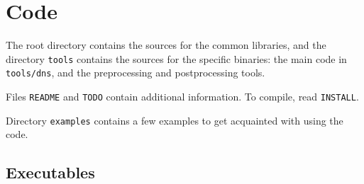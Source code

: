 \chapter{Code}\label{sec:code}

The root directory contains the sources for the common libraries, and the directory {\tt tools} contains the sources for the specific binaries: the main code in {\tt tools/dns}, and the preprocessing and postprocessing tools.

Files {\tt README} and {\tt TODO} contain additional information. To compile, read {\tt INSTALL}.

Directory {\tt examples} contains a few examples to get acquainted with using the code.

\section{Executables}

